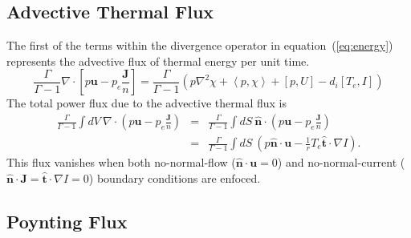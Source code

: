 \documentclass[letterpaper]{book}
\renewcommand{\vec}[1]{\ensuremath{\mathbf{#1}}}
\renewcommand{\u}{\vec{u}}
\renewcommand{\j}{\vec{J}}
\newcommand{\grad}[1]{\nabla #1}
\renewcommand{\div}[1]{\nabla \cdot #1}
\newcommand{\lp}[1]{\nabla^2 #1}
\newcommand{\pb}[2]{\left[#1,#2\right]}
\newcommand{\ip}[2]{\left\langle  #1,#2\right\rangle}
\newcommand{\uvec}[1]{\ensuremath{\vec{\hat{#1}}}}
\begin{document}
\subsection{Advective Thermal Flux}

The first of the terms within the divergence operator in
equation~(\ref{eq:energy}) represents the advective flux of thermal
energy per unit time.
\begin{equation}
  \frac{\Gamma}{\Gamma - 1} \div \left[ p \u - p_e \frac{\j}{n}
  \right] = \frac{\Gamma}{\Gamma - 1} \left( 
  p \lp\chi + \ip{p}{\chi} + \pb{p}{U} - d_i \pb{T_e}{I} \right)
\end{equation}
The total power flux due to the advective thermal flux is
\begin{eqnarray*}
  \frac{\Gamma}{\Gamma - 1} \int dV\ \div 
  \left( p \u - p_e \frac{\j}{n} \right) 
  & = & \frac{\Gamma}{\Gamma - 1} \int dS\ \uvec{n} \cdot
  \left( p \u - p_e \frac{\j}{n} \right) \\ 
  & = & \frac{\Gamma}{\Gamma - 1} \int dS\ 
  \left( p \uvec{n} \cdot \u - \frac{1}{r} T_e \uvec{t}\cdot \grad I \right).
\end{eqnarray*}
This flux vanishes when both no-normal-flow ($\uvec{n} \cdot \u =
0$) and no-normal-current ($\uvec{n} \cdot \j = \uvec{t} \cdot \grad I
= 0$) boundary conditions are enfoced.

\subsection{Poynting Flux}
\end{document}
